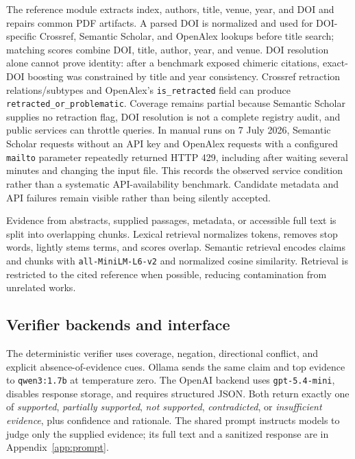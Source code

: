 \documentclass[12pt,toc=bib,toc=listof]{scrartcl}
\begin{document}
The reference module extracts index, authors, title, venue, year, and DOI and repairs common PDF artifacts. A parsed DOI is normalized and used for DOI-specific Crossref, Semantic Scholar, and OpenAlex lookups before title search; matching scores combine DOI, title, author, year, and venue. DOI resolution alone cannot prove identity: after a benchmark exposed chimeric citations, exact-DOI boosting was constrained by title and year consistency. Crossref retraction relations/subtypes and OpenAlex's \texttt{is\_retracted} field can produce \texttt{retracted\_or\_problematic}. Coverage remains partial because Semantic Scholar supplies no retraction flag, DOI resolution is not a complete registry audit, and public services can throttle queries. In manual runs on 7 July 2026, Semantic Scholar requests without an API key and OpenAlex requests with a configured \texttt{mailto} parameter repeatedly returned HTTP 429, including after waiting several minutes and changing the input file. This records the observed service condition rather than a systematic API-availability benchmark. Candidate metadata and API failures remain visible rather than being silently accepted.

Evidence from abstracts, supplied passages, metadata, or accessible full text is split into overlapping chunks. Lexical retrieval normalizes tokens, removes stop words, lightly stems terms, and scores overlap. Semantic retrieval encodes claims and chunks with \texttt{all-MiniLM-L6-v2} and normalized cosine similarity. Retrieval is restricted to the cited reference when possible, reducing contamination from unrelated works.

\subsection{Verifier backends and interface}

The deterministic verifier uses coverage, negation, directional conflict, and explicit absence-of-evidence cues. Ollama sends the same claim and top evidence to \texttt{qwen3:1.7b} at temperature zero. The OpenAI backend uses \texttt{gpt-5.4-mini}, disables response storage, and requires structured JSON. Both return exactly one of \emph{supported}, \emph{partially supported}, \emph{not supported}, \emph{contradicted}, or \emph{insufficient evidence}, plus confidence and rationale. The shared prompt instructs models to judge only the supplied evidence; its full text and a sanitized response are in Appendix~\ref{app:prompt}.
\end{document}
